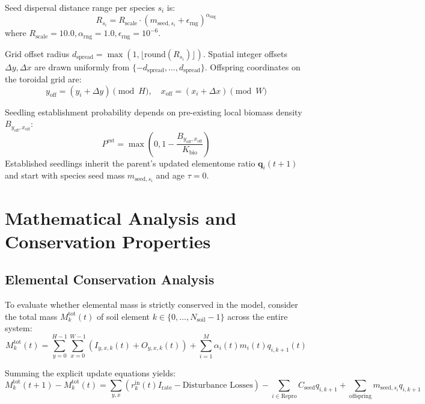 \documentclass[11pt,a4paper]{article}
\begin{document}
Seed dispersal distance range per species $s_i$ is:
\begin{equation}
R_{s_i} = R_{\text{scale}} \cdot \left(m_{\text{seed}, s_i} + \epsilon_{\text{rng}}\right)^{\alpha_{\text{rng}}}
\end{equation}
where $R_{\text{scale}} = 10.0, \alpha_{\text{rng}} = 1.0, \epsilon_{\text{rng}} = 10^{-6}$.

Grid offset radius $d_{\text{spread}} = \max(1, \lfloor \text{round}(R_{s_i}) \rfloor)$. Spatial integer offsets $\Delta y, \Delta x$ are drawn uniformly from $\{-d_{\text{spread}}, \dots, d_{\text{spread}}\}$. Offspring coordinates on the toroidal grid are:
\begin{equation}
y_{\text{off}} = (y_i + \Delta y) \pmod H, \quad x_{\text{off}} = (x_i + \Delta x) \pmod W
\end{equation}

Seedling establishment probability depends on pre-existing local biomass density $B_{y_{\text{off}}, x_{\text{off}}}$:
\begin{equation}
P^{\text{est}} = \max\left(0, 1 - \frac{B_{y_{\text{off}}, x_{\text{off}}}}{K_{\text{bio}}}\right)
\end{equation}
Established seedlings inherit the parent's updated elementome ratio $\boldsymbol{q}_i(t+1)$ and start with species seed mass $m_{\text{seed}, s_i}$ and age $\tau = 0$.

\section{Mathematical Analysis and Conservation Properties}

\subsection{Elemental Conservation Analysis}
To evaluate whether elemental mass is strictly conserved in the model, consider the total mass $M_k^{\text{tot}}(t)$ of soil element $k \in \{0, \dots, N_{\text{soil}}-1\}$ across the entire system:
\begin{equation}
M_k^{\text{tot}}(t) = \sum_{y=0}^{H-1} \sum_{x=0}^{W-1} \left( I_{y,x,k}(t) + O_{y,x,k}(t) \right) + \sum_{i=1}^{M} \alpha_i(t) m_i(t) q_{i, k+1}(t)
\end{equation}

Summing the explicit update equations yields:
\begin{equation}
M_k^{\text{tot}}(t+1) - M_k^{\text{tot}}(t) = \sum_{y,x} \left( r^{\text{in}}_k(t) I_{\text{rate}} - \text{Disturbance Losses} \right) - \sum_{i \in \text{Repro}} C_{\text{seed}} q_{i, k+1} + \sum_{\text{offspring}} m_{\text{seed}, s_i} q_{i, k+1}
\end{equation}
\end{document}

